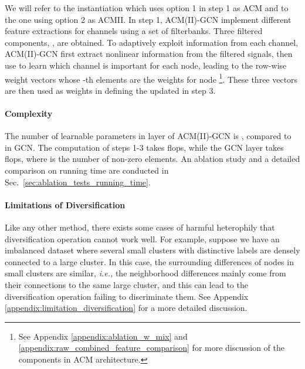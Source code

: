 \documentclass{article}
\newcommand\ie{\textit{i.e.,}}
\newcommand{\0}{{\boldsymbol{0}}}
\newcommand{\6}{{\partial}}
\newcommand{\8}{{\infty}}
\newcommand{\4}{{\nabla}}
\begin{document}
We will refer to the instantiation which uses option 1 in step 1 as ACM and to the one using option 2 as ACMII. In step 1, ACM(II)-GCN implement different feature extractions for  channels using a set of filterbanks. Three filtered components, , are obtained. To adaptively exploit information from each channel, ACM(II)-GCN first extract nonlinear information from the filtered signals, then use  to learn which channel is important for each node, leading to the row-wise weight vectors  whose -th elements are the weights for node  \footnote{See Appendix \ref{appendix:ablation_w_mix} and \ref{appendix:raw_combined_feature_comparison} for more discussion of the components in ACM architecture.}. These three vectors are then used as weights in defining the updated  in step 3.



\vspace{-0.2cm}
\paragraph{Complexity} The number of learnable parameters in layer  of ACM(II)-GCN is , compared to  in GCN. The computation of steps 1-3 takes  flops, while the GCN layer takes  flops, where  is the number of non-zero elements. An ablation study and a detailed comparison on running time are conducted in Sec.~\ref{sec:ablation_tests_running_time}.
\vspace{-0.2cm}
\paragraph{Limitations of Diversification} Like any other method, there exists some cases of harmful heterophily that diversification operation cannot work well. For example, suppose we have an imbalanced dataset where several small clusters with distinctive labels are densely connected to a large cluster. In this case, the surrounding differences of nodes in small clusters are similar, \ie{} the neighborhood differences  mainly come from their connections to the same large cluster, and this can lead to the diversification operation failing to discriminate them. See Appendix \ref{appendix:limitation_diversification} for a more detailed discussion.





\vspace{-0.3cm}
\end{document}
